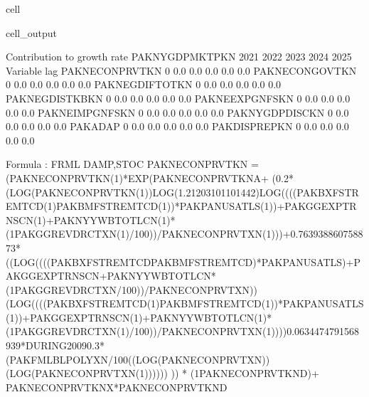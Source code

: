 \documentclass[letterpaper,10pt,english]{jupyterBook}
\begin{document}
\begin{sphinxuseclass}{cell}
\begin{sphinxVerbatimOutput}
\begin{sphinxuseclass}{cell_output}
\begin{sphinxVerbatim}[commandchars=\\\{\}]
 Contribution to growth rate PAKNYGDPMKTPKN
                          2021        2022        2023        2024        2025
Variable       lag                                                            
PAKNECONPRVTKN 0         \PYGZhy{}0.0\PYGZpc{}       \PYGZhy{}0.0\PYGZpc{}       \PYGZhy{}0.0\PYGZpc{}       \PYGZhy{}0.0\PYGZpc{}       \PYGZhy{}0.0\PYGZpc{}
PAKNECONGOVTKN 0          0.0\PYGZpc{}        0.0\PYGZpc{}        0.0\PYGZpc{}        0.0\PYGZpc{}        0.0\PYGZpc{}
PAKNEGDIFTOTKN 0          0.0\PYGZpc{}        0.0\PYGZpc{}        0.0\PYGZpc{}        0.0\PYGZpc{}        0.0\PYGZpc{}
PAKNEGDISTKBKN 0         \PYGZhy{}0.0\PYGZpc{}       \PYGZhy{}0.0\PYGZpc{}       \PYGZhy{}0.0\PYGZpc{}       \PYGZhy{}0.0\PYGZpc{}       \PYGZhy{}0.0\PYGZpc{}
PAKNEEXPGNFSKN 0         \PYGZhy{}0.0\PYGZpc{}       \PYGZhy{}0.0\PYGZpc{}       \PYGZhy{}0.0\PYGZpc{}       \PYGZhy{}0.0\PYGZpc{}       \PYGZhy{}0.0\PYGZpc{}
PAKNEIMPGNFSKN 0          0.0\PYGZpc{}        0.0\PYGZpc{}        0.0\PYGZpc{}        0.0\PYGZpc{}        0.0\PYGZpc{}
PAKNYGDPDISCKN 0         \PYGZhy{}0.0\PYGZpc{}       \PYGZhy{}0.0\PYGZpc{}       \PYGZhy{}0.0\PYGZpc{}       \PYGZhy{}0.0\PYGZpc{}       \PYGZhy{}0.0\PYGZpc{}
PAKADAP        0         \PYGZhy{}0.0\PYGZpc{}       \PYGZhy{}0.0\PYGZpc{}       \PYGZhy{}0.0\PYGZpc{}       \PYGZhy{}0.0\PYGZpc{}       \PYGZhy{}0.0\PYGZpc{}
PAKDISPREPKN   0         \PYGZhy{}0.0\PYGZpc{}       \PYGZhy{}0.0\PYGZpc{}       \PYGZhy{}0.0\PYGZpc{}       \PYGZhy{}0.0\PYGZpc{}       \PYGZhy{}0.0\PYGZpc{}

Formula        : FRML \PYGZlt{}DAMP,STOC\PYGZgt{} PAKNECONPRVTKN = (PAKNECONPRVTKN(\PYGZhy{}1)*EXP(PAKNECONPRVTKN\PYGZus{}A+ (\PYGZhy{}0.2*(LOG(PAKNECONPRVTKN(\PYGZhy{}1))\PYGZhy{}LOG(1.21203101101442)\PYGZhy{}LOG((((PAKBXFSTREMTCD(\PYGZhy{}1)\PYGZhy{}PAKBMFSTREMTCD(\PYGZhy{}1))*PAKPANUSATLS(\PYGZhy{}1))+PAKGGEXPTRNSCN(\PYGZhy{}1)+PAKNYYWBTOTLCN(\PYGZhy{}1)*(1\PYGZhy{}PAKGGREVDRCTXN(\PYGZhy{}1)/100))/PAKNECONPRVTXN(\PYGZhy{}1)))+0.763938860758873*((LOG((((PAKBXFSTREMTCD\PYGZhy{}PAKBMFSTREMTCD)*PAKPANUSATLS)+PAKGGEXPTRNSCN+PAKNYYWBTOTLCN*(1\PYGZhy{}PAKGGREVDRCTXN/100))/PAKNECONPRVTXN))\PYGZhy{}(LOG((((PAKBXFSTREMTCD(\PYGZhy{}1)\PYGZhy{}PAKBMFSTREMTCD(\PYGZhy{}1))*PAKPANUSATLS(\PYGZhy{}1))+PAKGGEXPTRNSCN(\PYGZhy{}1)+PAKNYYWBTOTLCN(\PYGZhy{}1)*(1\PYGZhy{}PAKGGREVDRCTXN(\PYGZhy{}1)/100))/PAKNECONPRVTXN(\PYGZhy{}1))))\PYGZhy{}0.0634474791568939*DURING\PYGZus{}2009\PYGZhy{}0.3*(PAKFMLBLPOLYXN/100\PYGZhy{}((LOG(PAKNECONPRVTXN))\PYGZhy{}(LOG(PAKNECONPRVTXN(\PYGZhy{}1)))))) )) * (1\PYGZhy{}PAKNECONPRVTKN\PYGZus{}D)+ PAKNECONPRVTKN\PYGZus{}X*PAKNECONPRVTKN\PYGZus{}D  \PYGZdl{} 


\end{sphinxVerbatim}
\end{sphinxuseclass}
\end{sphinxVerbatimOutput}
\end{sphinxuseclass}
\end{document}
